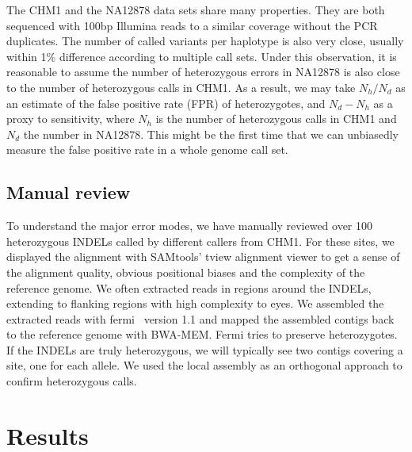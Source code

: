 \documentclass{bioinfo}
\begin{document}
\begin{methods}
The CHM1 and the NA12878 data sets share many properties. They are both
sequenced with 100bp Illumina reads to a similar coverage without the PCR
duplicates. The number of called variants per haplotype is also very close,
usually within 1\% difference according to multiple call sets. Under this
observation, it is reasonable to assume the number of heterozygous errors in
NA12878 is also close to the number of heterozygous calls in CHM1. As a result,
we may take $N_h/N_d$ as an estimate of the false positive rate (FPR) of
heterozygotes, and $N_d-N_h$ as a proxy to sensitivity, where $N_h$ is the
number of heterozygous calls in CHM1 and $N_d$ the number in NA12878. This
might be the first time that we can unbiasedly measure the false positive rate
in a whole genome call set.

\subsection{Manual review}

To understand the major error modes, we have manually reviewed over 100
heterozygous INDELs called by different callers from CHM1. For these sites,
we displayed the alignment with SAMtools' tview alignment viewer to get a sense
of the alignment quality, obvious positional biases and the complexity of the
reference genome. We often extracted reads in regions around the INDELs,
extending to flanking regions with high complexity to eyes. We assembled the
extracted reads with fermi~\citep{Li:2012fk} version 1.1 and mapped the
assembled contigs back to the reference genome with BWA-MEM. Fermi tries to
preserve heterozygotes. If the INDELs are truly heterozygous, we will typically
see two contigs covering a site, one for each allele. We used the local
assembly as an orthogonal approach to confirm heterozygous calls.


\end{methods}

\section{Results}
\end{document}
